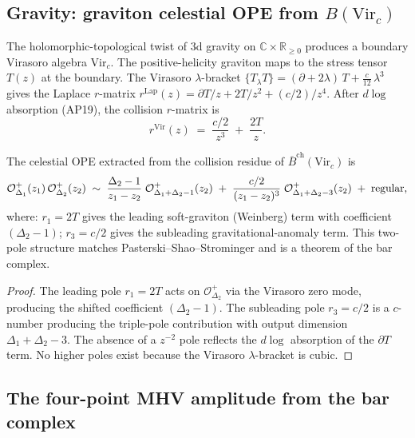 \documentclass[11pt]{article}
\newcommand{\cO}{\mathcal{O}}
\newcommand{\barB}{\overline{B}}
\newcommand{\C}{\mathbb{C}}
\newcommand{\R}{\mathbb{R}}
\begin{document}
\subsection{Gravity: graviton celestial OPE from $B(\mathrm{Vir}_c)$}
\label{subsec:graviton-celestial-ope-cel}

The holomorphic-topological twist of $3$d gravity on
$\C \times \R_{\ge 0}$ produces a boundary Virasoro algebra
$\mathrm{Vir}_c$.  The positive-helicity graviton maps to the stress
tensor $T(z)$ at the boundary.  The Virasoro $\lambda$-bracket
$\{T {}_\lambda T\} = (\partial + 2\lambda)\, T + \tfrac{c}{12}\,\lambda^3$
gives the Laplace $r$-matrix
$r^{\mathrm{Lap}}(z) = \partial T/z + 2T/z^2 + (c/2)/z^4$.
After $d\log$ absorption (AP19), the collision $r$-matrix is
\[
r^{\mathrm{Vir}}(z)
\;=\;
\frac{c/2}{z^3} \;+\; \frac{2T}{z}.
\]

\begin{theorem}
\label{thm:celestial-graviton-ope-cel}
The celestial OPE extracted from the collision residue of
$\barB^{\mathrm{ch}}(\mathrm{Vir}_c)$ is
\[
\cO^{+}_{\Delta_1}(z_1)\,\cO^{+}_{\Delta_2}(z_2)
\;\sim\;
\frac{\Delta_2 - 1}{z_1 - z_2}\;
\cO^{+}_{\Delta_1 + \Delta_2 - 1}(z_2)
\;+\;
\frac{c/2}{(z_1 - z_2)^3}\;
\cO^{+}_{\Delta_1 + \Delta_2 - 3}(z_2)
\;+\; \textup{regular},
\]
where: $r_1 = 2T$ gives the leading soft-graviton (Weinberg) term with
coefficient $(\Delta_2 - 1)$; $r_3 = c/2$ gives the subleading
gravitational-anomaly term.  This two-pole structure matches
Pasterski--Shao--Strominger and is a theorem of the bar complex.
\end{theorem}

\begin{proof}
The leading pole $r_1 = 2T$ acts on $\cO^+_{\Delta_2}$ via the Virasoro
zero mode, producing the shifted coefficient $(\Delta_2 - 1)$.  The
subleading pole $r_3 = c/2$ is a $c$-number producing the triple-pole
contribution with output dimension $\Delta_1 + \Delta_2 - 3$.  The
absence of a $z^{-2}$ pole reflects the $d\log$ absorption of the
$\partial T$ term.  No higher poles exist because the Virasoro
$\lambda$-bracket is cubic.
\end{proof}


\subsection{The four-point MHV amplitude from the bar complex}
\label{subsec:mhv-bar-complex-cel}
\end{document}
